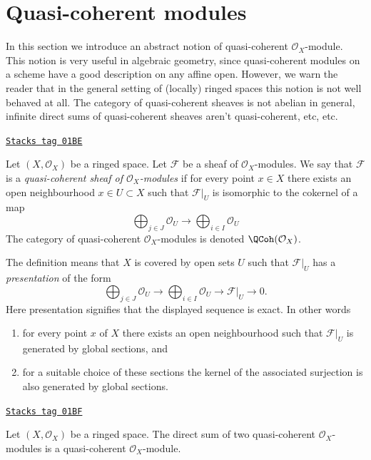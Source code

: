\section{Quasi-coherent modules}
\label{modules-section-quasi-coherent}
In this section we introduce an abstract notion of
quasi-coherent $\mathcal{O}_X$-module. This notion is very
useful in algebraic geometry, since quasi-coherent modules
on a scheme have a good description on any affine open.
However, we warn the reader that
in the general setting of (locally) ringed spaces
this notion is not well behaved at all. The category of
quasi-coherent sheaves is not abelian in general, infinite
direct sums of quasi-coherent sheaves aren't quasi-coherent, etc, etc.

\begin{definition}
\label{modules-definition-quasi-coherent}
\href{https://stacks.math.columbia.edu/tag/01BE}{\texttt{Stacks tag 01BE}}

Let $(X, \mathcal{O}_X)$ be a ringed space.
Let $\mathcal{F}$ be a sheaf of $\mathcal{O}_X$-modules.
We say that $\mathcal{F}$ is a {\it quasi-coherent
sheaf of $\mathcal{O}_X$-modules} if for every
point $x \in X$ there exists an open neighbourhood
$x\in U \subset X$ such that $\mathcal{F}|_U$
is isomorphic to the cokernel of a map
$$
\bigoplus\nolimits_{j \in J}
\mathcal{O}_U
\longrightarrow
\bigoplus\nolimits_{i \in I}
\mathcal{O}_U
$$
The category of quasi-coherent $\mathcal{O}_X$-modules
is denoted $\QCoh(\mathcal{O}_X)$.
\end{definition}

The definition means that $X$ is covered by open sets $U$
such that $\mathcal{F}|_U$ has a {\it presentation}
of the form
$$
\bigoplus\nolimits_{j \in J}
\mathcal{O}_U
\longrightarrow
\bigoplus\nolimits_{i \in I}
\mathcal{O}_U
\longrightarrow
\mathcal{F}|_U
\longrightarrow
0.
$$
Here presentation signifies that the displayed
sequence is exact. In other words
\begin{enumerate}
\item for every point $x$ of $X$ there exists
an open neighbourhood such that $\mathcal{F}|_U$
is generated by global sections, and
\item for a suitable choice of these sections
the kernel of the associated surjection is also
generated by global sections.
\end{enumerate}

\begin{lemma}
\label{modules-lemma-direct-sum-quasi-coherent}
\href{https://stacks.math.columbia.edu/tag/01BF}{\texttt{Stacks tag 01BF}}

Let $(X, \mathcal{O}_X)$ be a ringed space.
The direct sum of two quasi-coherent $\mathcal{O}_X$-modules is
a quasi-coherent $\mathcal{O}_X$-module.
\end{lemma}

